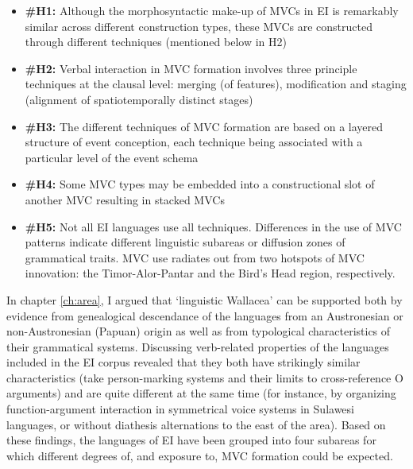 \begin{itemize}
\item \textbf{\#H1:} Although the morphosyntactic make-up of MVCs in EI is remarkably similar across different construction types, these MVCs are constructed through different techniques (mentioned below in H2)
\item \textbf{\#H2:} Verbal interaction in MVC formation involves three principle techniques at the clausal level: merging (of features), modification and staging (alignment of spatiotemporally distinct stages)
\item \textbf{\#H3:} The different techniques of MVC formation are based on a layered structure of event conception, each technique being associated with a particular level of the event schema
\item \textbf{\#H4:} Some MVC types may be embedded into a constructional slot of another MVC resulting in stacked MVCs
\item \textbf{\#H5:} Not all EI languages use all techniques. Differences in the use of MVC patterns indicate different linguistic subareas or diffusion zones of grammatical traits. MVC use radiates out from two hotspots of MVC innovation: the Timor-Alor-Pantar and the Bird's Head region, respectively.
\end{itemize}

In chapter \ref{ch:area}, I argued that `linguistic Wallacea' can be supported both by evidence from genealogical descendance of the languages from an Austronesian or non-Austronesian (Papuan) origin as well as from typological characteristics of their grammatical systems. Discussing verb-related properties of the languages included in the EI corpus revealed that they both have strikingly similar characteristics (take person-marking systems and their limits to cross-reference O arguments) and are quite different at the same time (for instance, by organizing function-argument interaction in symmetrical voice systems in Sulawesi languages, or without diathesis alternations to the east of the area). Based on these findings, the languages of EI have been grouped into four subareas for which different degrees of, and exposure to, MVC formation could be expected. 

